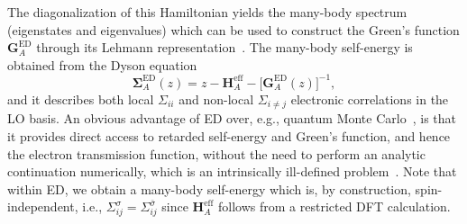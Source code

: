 \documentclass[aps,prx,twocolumn,superscriptaddress]{revtex4-2}
\begin{document}
The diagonalization of this Hamiltonian yields the many-body spectrum (eigenstates and eigenvalues) which can be used to construct the Green's function $\mathbf{G}^{\mathrm{ED}}_A$ through its Lehmann representation~\cite{bruus2004many}.
The many-body self-energy is obtained from the Dyson equation
\begin{equation} \label{eq:SigmaED}
    \mathbf{\Sigma}^{\mathrm{ED}}_A(z) = z - \mathbf{H}^{\mathrm{eff}}_A-\big[\mathbf{G}^{\mathrm{ED}}_A(z)\big]^{-1},
\end{equation}
and it describes both local $\Sigma_{ii}$ and non-local $\Sigma_{i\neq j}$ electronic correlations in the LO basis. 
An obvious advantage of ED over, e.g., quantum Monte Carlo~\cite{gullRMP83}, is that it provides direct access to retarded self-energy and Green's function, and hence the electron transmission function, without the need to perform an analytic continuation numerically, which is an intrinsically ill-defined problem~\cite{jarrellPR269}.
Note that within ED, we obtain a many-body self-energy which is, by construction, spin-independent, i.e., 
$\Sigma^{\sigma}_{ij}=\Sigma^{\bar{\sigma}}_{ij}$ 
since $\mathbf{H}^{\mathrm{eff}}_A$ follows from a restricted DFT calculation.
\end{document}
